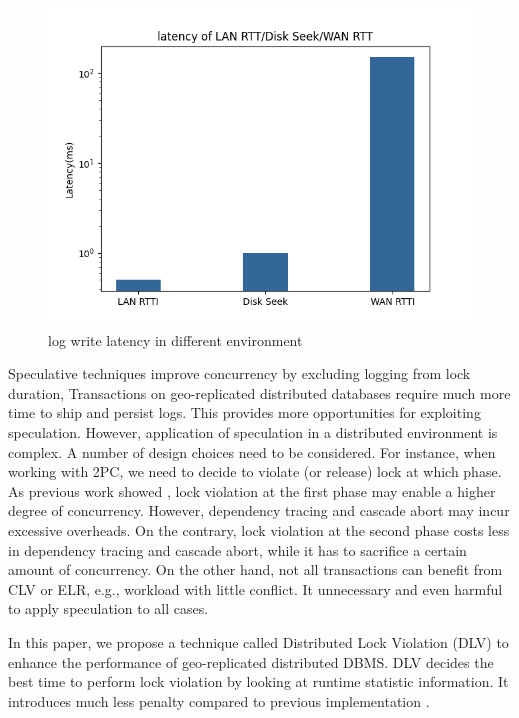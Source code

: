 \documentclass[conference]{IEEEtran}
\begin{document}
\begin{figure}[htbp]
  \centerline{\includegraphics[scale=0.3]{figure/log_write_latency.png}}
  \caption{log write latency in different environment}
  \label{fig:log_write_latency}
\end{figure}

Speculative techniques improve concurrency by excluding logging from lock duration,
Transactions on geo-replicated distributed databases require much more time to ship and persist logs.
This provides more opportunities for exploiting speculation.
However, application of speculation in a distributed environment is complex.
A number of design choices need to be considered.
For instance, when working with 2PC, we need to decide to violate (or release) lock at which phase.
As previous work showed \cite{CLV:conf/sigmod/GraefeLKTV13}, lock violation at the first phase may enable a higher degree of concurrency.
However, dependency tracing and cascade abort may incur excessive overheads.
On the contrary, lock violation at the second phase costs less in dependency tracing and cascade abort, while it has to sacrifice a certain amount of concurrency.
On the other hand, not all transactions can benefit from CLV or ELR, e.g., workload with little conflict.
It unnecessary and even harmful to apply speculation to all cases.

In this paper, we propose a technique called Distributed Lock Violation (DLV) to enhance the performance of geo-replicated distributed DBMS.
DLV decides the best time to perform lock violation by looking at runtime statistic information.
It introduces much less penalty compared to previous implementation \cite{CLV:conf/sigmod/GraefeLKTV13}.
\end{document}
